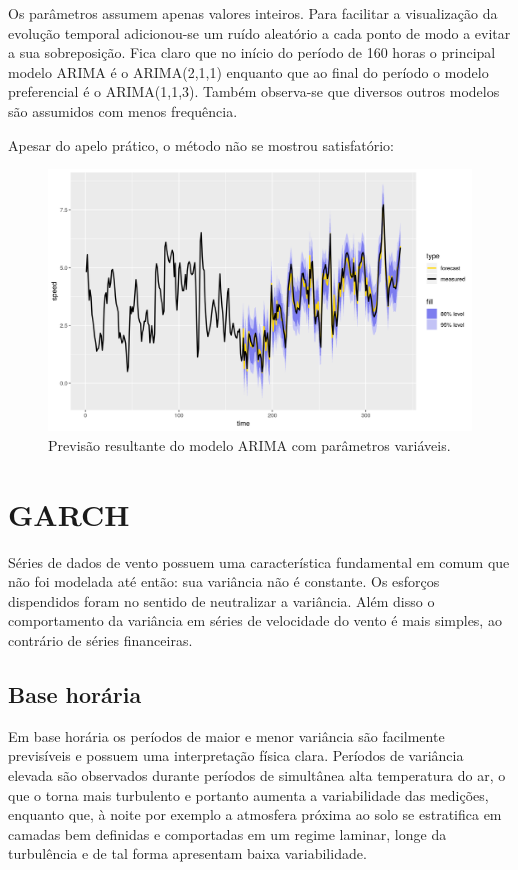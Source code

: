 \documentclass[
	12pt,				%
	openright,			%
	oneside,			%
	a4paper,			%
	english,			%
	french,				%
	spanish,			%
	brazil				%
	]{abntex2}
\begin{document}
Os parâmetros assumem apenas valores inteiros. Para facilitar a visualização da evolução temporal adicionou-se um ruído aleatório a cada ponto de modo a evitar a sua sobreposição. Fica claro que no início do período de 160 horas o principal modelo ARIMA é o ARIMA(2,1,1) enquanto que ao final do período o modelo preferencial é o ARIMA(1,1,3). Também observa-se que diversos outros modelos são assumidos com menos frequência.

Apesar do apelo prático, o método não se mostrou satisfatório:


\begin{figure}[h]
    \centering
	\includegraphics[width=\textwidth]{var_result}
	\caption{Previsão resultante do modelo ARIMA com parâmetros variáveis.}
\end{figure}
\FloatBarrier

\chapter{GARCH}

Séries de dados de vento possuem uma característica fundamental em comum que não foi modelada até então: sua variância não é constante. Os esforços dispendidos foram no sentido de neutralizar a variância. Além disso o comportamento da variância em séries de velocidade do vento é mais simples, ao contrário de séries financeiras.

\section{Base horária}

Em base horária os períodos de maior e menor variância são facilmente previsíveis e possuem uma interpretação física clara. Períodos de variância elevada são observados durante períodos de simultânea alta temperatura do ar, o que o torna mais turbulento e portanto aumenta a variabilidade das medições, enquanto que, à noite por exemplo a atmosfera próxima ao solo se estratifica em camadas bem definidas e comportadas em um regime laminar, longe da turbulência e de tal forma apresentam baixa variabilidade.
\end{document}
